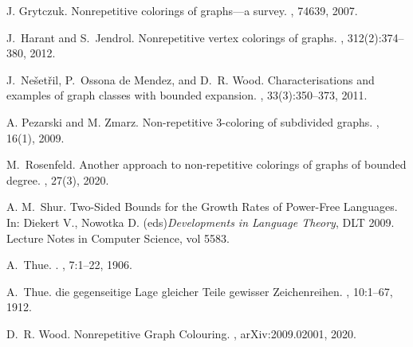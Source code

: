 \documentclass[a4paper,12pt]{article}
\begin{document}
\begin{thebibliography}{1}
J. Grytczuk.   
\newblock Nonrepetitive colorings of graphs—a survey.
,  74639,  2007.

J.~Harant and S.~Jendrol.
\newblock Nonrepetitive vertex colorings of graphs.
, 312(2):374--380, 2012.

J.~Nešetřil, P.~Ossona de Mendez, and D.~R. Wood.
\newblock Characterisations and examples of graph classes with bounded expansion.
, 33(3):350–373, 2011.

A. Pezarski and M. Zmarz.
\newblock Non-repetitive 3-coloring of subdivided graphs.
, 16(1), 2009.

M.~Rosenfeld.
\newblock Another approach to non-repetitive colorings of graphs of bounded degree.
, 27(3), 2020.

A. M.~Shur.
\newblock Two-Sided Bounds for the Growth Rates of Power-Free Languages.
\newblock In: Diekert V., Nowotka D. (eds){\em Developments in Language Theory}, DLT 2009.
 Lecture Notes in Computer Science, vol 5583.
 
A.~Thue.
.
, 7:1--22,
  1906.

A.~Thue.
 die gegenseitige {L}age gleicher {T}eile gewisser
  {Z}eichenreihen.
,
  10:1--67, 1912.

D.~R. Wood.
\newblock Nonrepetitive Graph Colouring.
, arXiv:2009.02001, 2020.
\end{thebibliography}
\end{document}
